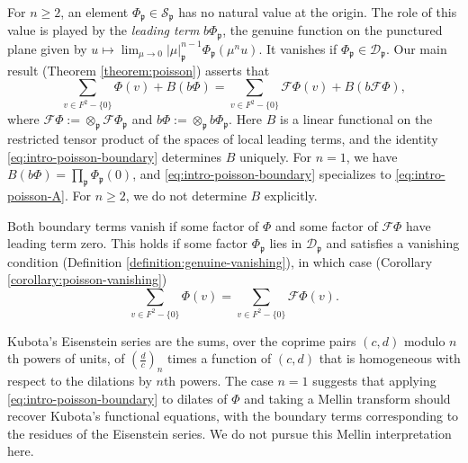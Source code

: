 \documentclass[reqno]{amsart}
\newcommand{\qr}[2]{\left( \frac{#1}{#2} \right)}
\theoremstyle{plain}
\theoremstyle{definition}
\theoremstyle{itplain}
\numberwithin{equation}{section}
\numberwithin{theorem}{section}
\begin{document}
For \(n\geq 2\), an element \(\Phi_{\mathfrak p}\in\mathcal S_{\mathfrak p}\) has no natural value at the origin.  The role of this value is played by the \emph{leading term} \(b\Phi_{\mathfrak p}\), the genuine function on the punctured plane given by \(u\mapsto\lim_{\mu\to0}|\mu|_{\mathfrak p}^{n-1}\Phi_{\mathfrak p}(\mu^n u)\).  It vanishes if $\Phi_{\mathfrak{p}} \in \mathcal{D}_{\mathfrak{p}}$.  Our main result (Theorem \ref{theorem:poisson}) asserts that
\begin{equation}\label{eq:intro-poisson-boundary}
  \sum_{v \in F^2 - \{0\}} \Phi(v) + B(b \Phi)
  =
  \sum_{v \in F^2 - \{0\}} \mathcal{F} \Phi(v) + B(b \mathcal{F} \Phi),
\end{equation}
where $\mathcal{F} \Phi := \otimes_{\mathfrak{p}} \mathcal{F} \Phi_{\mathfrak{p}}$ and $b \Phi := \otimes_{\mathfrak{p}} b \Phi_{\mathfrak{p}}$.  Here $B$ is a linear functional on the restricted tensor product of the spaces of local leading terms, and the identity \eqref{eq:intro-poisson-boundary} determines $B$ uniquely.  For $n = 1$, we have $B(b \Phi) = \prod_{\mathfrak{p}} \Phi_{\mathfrak{p}}(0)$, and \eqref{eq:intro-poisson-boundary} specializes to \eqref{eq:intro-poisson-A}.  For $n \geq 2$, we do not determine $B$ explicitly.

Both boundary terms vanish if some factor of $\Phi$ and some factor of $\mathcal{F} \Phi$ have leading term zero.  This holds if some factor $\Phi_{\mathfrak{p}}$ lies in $\mathcal{D}_{\mathfrak{p}}$ and satisfies a vanishing condition (Definition \ref{definition:genuine-vanishing}), in which case (Corollary \ref{corollary:poisson-vanishing})
\begin{equation}\label{eq:intro-poisson-metaplectic}
  \sum_{v \in F^2 - \{0\}} \Phi(v) = \sum_{v \in F^2 - \{0\}} \mathcal{F} \Phi(v).
\end{equation}

Kubota's Eisenstein series are the sums, over the coprime pairs $(c, d)$ modulo $n$th powers of units, of $\qr{d}{c}_n$ times a function of $(c, d)$ that is homogeneous with respect to the dilations by $n$th powers.  The case $n = 1$ suggests that applying \eqref{eq:intro-poisson-boundary} to dilates of $\Phi$ and taking a Mellin transform should recover Kubota's functional equations, with the boundary terms corresponding to the residues of the Eisenstein series.  We do not pursue this Mellin interpretation here.
\end{document}
